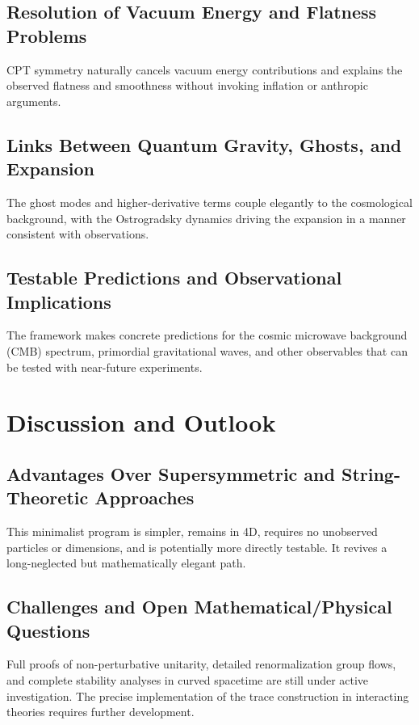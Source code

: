 \documentclass{article}
\begin{document}
\subsection{Resolution of Vacuum Energy and Flatness Problems}

CPT symmetry naturally cancels vacuum energy contributions and explains the observed flatness and smoothness without invoking inflation or anthropic arguments.

\subsection{Links Between Quantum Gravity, Ghosts, and Expansion}

The ghost modes and higher-derivative terms couple elegantly to the cosmological background, with the Ostrogradsky dynamics driving the expansion in a manner consistent with observations.

\subsection{Testable Predictions and Observational Implications}

The framework makes concrete predictions for the cosmic microwave background (CMB) spectrum, primordial gravitational waves, and other observables that can be tested with near-future experiments.

\section{Discussion and Outlook}
\label{sec:discussion}

\subsection{Advantages Over Supersymmetric and String-Theoretic Approaches}

This minimalist program is simpler, remains in 4D, requires no unobserved particles or dimensions, and is potentially more directly testable. It revives a long-neglected but mathematically elegant path.

\subsection{Challenges and Open Mathematical/Physical Questions}

Full proofs of non-perturbative unitarity, detailed renormalization group flows, and complete stability analyses in curved spacetime are still under active investigation. The precise implementation of the trace construction in interacting theories requires further development.
\end{document}
